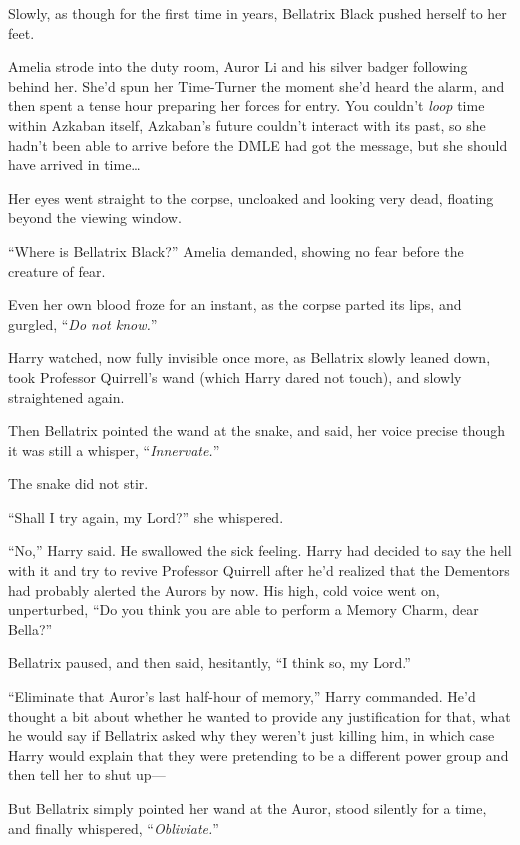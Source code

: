 Slowly, as though for the first time in years, Bellatrix Black pushed herself to her feet.

\later

Amelia strode into the duty room, Auror Li and his silver badger following behind her. She’d spun her Time-Turner the moment she’d heard the alarm, and then spent a tense hour preparing her forces for entry. You couldn’t \emph{loop} time within Azkaban itself, Azkaban’s future couldn’t interact with its past, so she hadn’t been able to arrive before the DMLE had got the message, but she should have arrived in time…

Her eyes went straight to the corpse, uncloaked and looking very dead, floating beyond the viewing window.

“Where is Bellatrix Black?” Amelia demanded, showing no fear before the creature of fear.

Even her own blood froze for an instant, as the corpse parted its lips, and gurgled, “\emph{Do not know.}”

\later

Harry watched, now fully invisible once more, as Bellatrix slowly leaned down, took Professor Quirrell’s wand (which Harry dared not touch), and slowly straightened again.

Then Bellatrix pointed the wand at the snake, and said, her voice precise though it was still a whisper, “\emph{Innervate.}”

The snake did not stir.

“Shall I try again, my Lord?” she whispered.

“No,” Harry said. He swallowed the sick feeling. Harry had decided to say the hell with it and try to revive Professor Quirrell after he’d realized that the Dementors had probably alerted the Aurors by now. His high, cold voice went on, unperturbed, “Do you think you are able to perform a Memory Charm, dear Bella?”

Bellatrix paused, and then said, hesitantly, “I think so, my Lord.”

“Eliminate that Auror’s last half-hour of memory,” Harry commanded. He’d thought a bit about whether he wanted to provide any justification for that, what he would say if Bellatrix asked why they weren’t just killing him, in which case Harry would explain that they were pretending to be a different power group and then tell her to shut up—

But Bellatrix simply pointed her wand at the Auror, stood silently for a time, and finally whispered, “\emph{Obliviate.}”

